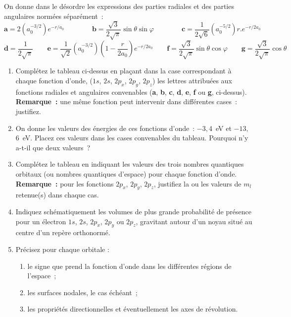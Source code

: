 On donne dans le d\'esordre les expressions des parties radiales et des parties angulaires norm\'ees s\'epar\'ement~:\\
$$
\textbf{a}=2\left(a_0^{-3/2}\right)e^{-r/a_0} \qquad \qquad
\textbf{b}=\frac{\sqrt{3}}{2\sqrt{\pi}}\sin{\theta}\sin{\varphi} \qquad \qquad
\textbf{c}=\frac{1}{2\sqrt{6}}\left(a_0^{-5/2}\right)r.e^{-r/2a_0}
$$
$$
\textbf{d}=\frac{1}{2\sqrt{\pi}}\qquad
\textbf{e}=\frac{1}{\sqrt{2}}\left(a_0^{-3/2}\right)\left(1-\frac{r}{2a_0}\right)e^{-r/2a_0}\qquad
\textbf{f}=\frac{\sqrt{3}}{2\sqrt{\pi}}\sin{\theta}\cos{\varphi}\qquad
\textbf{g}=\frac{\sqrt{3}}{2\sqrt{\pi}}\cos{\theta}
$$

\begin{enumerate}[\bf 1)]
\item Compl\'etez le tableau ci-dessus en pla\c{c}ant dans la case correspondant \`a chaque fonction d'onde, ($1s$, $2s$, $2p_x$, $2p_y$, $2p_z$) les lettres attribu\'ees aux fonctions radiales et angulaires convenables (\textbf{a}, \textbf{b}, \textbf{c}, \textbf{d}, \textbf{e}, \textbf{f} ou \textbf{g}, ci-dessus).\\

\textbf{Remarque~:} une m\^eme fonction peut intervenir dans diff\'erentes cases~: justifiez.

\item On donne les valeurs des \'energies de ces fonctions d'onde~: $-3,$4~eV et $-13,$6~eV. Placez ces valeurs dans les cases convenables du tableau. Pourquoi n'y a-t-il que deux valeurs~?

\item Compl\'etez le tableau en indiquant les valeurs des trois nombres quantiques orbitaux (ou nombres quantiques d'espace) pour chaque fonction d'onde.\\

\textbf{Remarque~:} pour les fonctions $2p_x$, $2p_y$, $2p_z$, justifiez la ou les valeurs de $m_l$ retenue(s) dans chaque cas.

\item Indiquez sch\'ematiquement les volumes de plus grande probabilit\'e de pr\'esence pour un \'electron $1s$, $2s$, $2p_x$, $2p_y$ ou $2p_z$, gravitant autour d'un noyau situ\'e au centre d'un rep\`ere orthonorm\'e.
\item Pr\'ecisez pour chaque orbitale :
\begin{enumerate}
\item le signe que prend la fonction d'onde dans les diff\'erentes r\'egions de l'espace~;
\item les surfaces nodales, le cas \'ech\'eant~;
\item les propri\'et\'es directionnelles et \'eventuellement les axes de r\'evolution.
\end{enumerate}
\end{enumerate}

